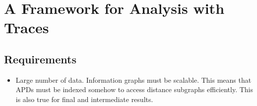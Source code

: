 \section{A Framework for Analysis with Traces}\label{sec:framework}

\subsection{Requirements}
\begin{itemize}

\item Large number of data. Information graphs must be scalable. This means that APDs must be indexed somehow to access distance subgraphs efficiently. This is also true for final and intermediate results.

\end{itemize}